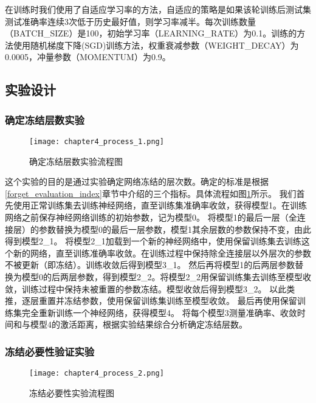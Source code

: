在训练时我们使用了自适应学习率的方法，自适应的策略是如果该轮训练后测试集测试准确率连续3次低于历史最好值，则学习率减半。每次训练数量（BATCH\_SIZE）是100，初始学习率（LEARNING\_RATE）为0.1。训练的方法使用随机梯度下降(SGD)训练方法，权重衰减参数（WEIGHT\_DECAY）为0.0005，冲量参数（MOMENTUM）为0.9。

\subsection{实验设计}
\subsubsection{确定冻结层数实验}
\begin{figure}
    \centering
    \texttt{[image: chapter4\_process\_1.png]}
    \caption{确定冻结层数实验流程图}
    \label{fig:chapter4_process_1}
\end{figure}

这个实验的目的是通过实验确定网络冻结的层次数。确定的标准是根据\ref{forget_evaluation_index}章节中介绍的三个指标。具体流程如图\ref{fig:chapter4_process_1}所示。
我们首先使用正常训练集去训练神经网络，直至训练集准确率收敛，获得模型1。在训练网络之前保存神经网络训练的初始参数，记为模型0。
将模型1的最后一层（全连接层）的参数替换为模型0的最后一层参数，模型1其余层数的参数保持不变，由此得到模型2\_1。
将模型2\_1加载到一个新的神经网络中，使用保留训练集去训练这个新的网络，直至训练准确率收敛。在训练过程中保持除全连接层以外层次的参数不被更新（即冻结）。训练收敛后得到模型3\_1。
然后再将模型1的后两层参数替换为模型0的后两层参数，得到模型2\_2。将模型2\_2用保留训练集去训练至模型收敛，训练过程中保持未被重置的参数冻结。模型收敛后得到模型3\_2。
以此类推，逐层重置并冻结参数，使用保留训练集训练至模型收敛。
最后再使用保留训练集完全重新训练一个神经网络，获得模型4。
将每个模型3测量准确率、收敛时间和与模型4的激活距离，根据实验结果综合分析确定冻结层数。

\subsubsection{冻结必要性验证实验}
\begin{figure}
    \centering
    \texttt{[image: chapter4\_process\_2.png]}
    \caption{冻结必要性实验流程图}
    \label{fig:chapter4_process_2}
\end{figure}

